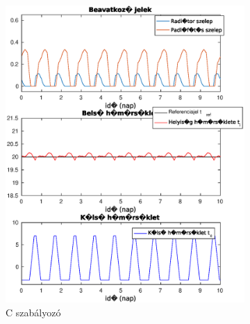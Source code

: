 \begin{figure}[H]
	\begin{subfigure}[t]{0.32\textwidth}
		\centering
		\includegraphics[trim=0 0 0 0, clip,width=\textwidth]{figures/onlab/constRefPrev/Cconstref}
		\caption{C szabályozó}
		\label{fig:constrefc}
	\end{subfigure}
	~
	\begin{subfigure}[t]{0.32\textwidth}
		\centering

\end{subfigure}
\end{figure}
